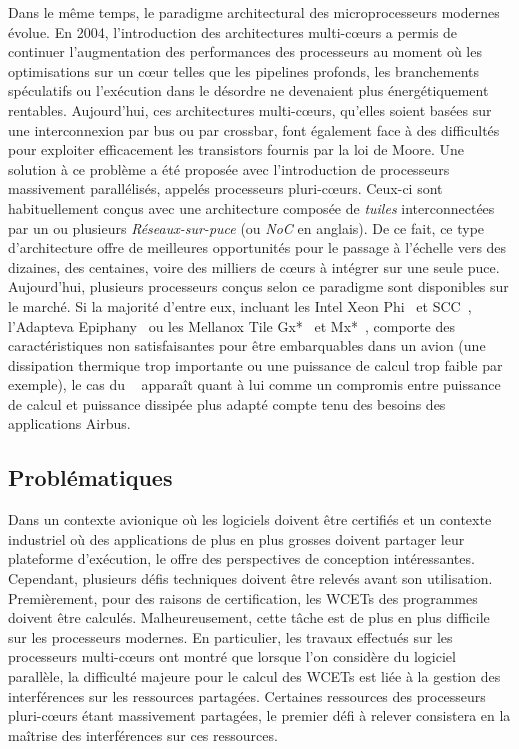 \documentclass[main.tex]{subfiles}
\begin{document}
Dans le même temps, le paradigme architectural des microprocesseurs modernes évolue. En 2004, l'introduction des architectures multi-c\oe{}urs a permis de continuer l'augmentation des performances des processeurs au moment où les optimisations sur un c\oe{}ur telles que les pipelines profonds, les branchements spéculatifs ou l'exécution dans le désordre ne devenaient plus énergétiquement rentables. Aujourd'hui, ces architectures multi-c\oe{}urs, qu'elles soient basées sur une interconnexion par bus ou par crossbar, font également face à des difficultés pour exploiter efficacement les transistors fournis par la loi de Moore. Une solution à ce problème a été proposée avec l'introduction de processeurs massivement parallélisés, appelés processeurs pluri-c\oe{}urs. Ceux-ci sont habituellement conçus avec une architecture composée de \emph{tuiles} interconnectées par un ou plusieurs \emph{Réseaux-sur-puce} (ou \emph{NoC} en anglais). De ce fait, ce type d'architecture offre de meilleures opportunités pour le passage à l'échelle vers des dizaines, des centaines, voire des milliers de c\oe{}urs à intégrer sur une seule puce. Aujourd'hui, plusieurs processeurs conçus selon ce paradigme sont disponibles sur le marché. Si la majorité d'entre eux, incluant les Intel Xeon Phi~\cite{XeonPhi} et SCC~\cite{intel_scc}, l'Adapteva Epiphany~\cite{Epiphany} ou les Mellanox Tile Gx*~\cite{TileGx} et Mx*~\cite{TileMx}, comporte des caractéristiques non satisfaisantes pour être embarquables dans un avion (une dissipation thermique trop importante ou une puissance de calcul trop faible par exemple), le cas du \mppalong~\cite{kalray_mppa} apparaît quant à lui comme un compromis entre puissance de calcul et puissance dissipée plus adapté compte tenu des besoins des applications Airbus.


\subsection{Problématiques}
Dans un contexte avionique où les logiciels doivent être certifiés et un contexte industriel où des applications de plus en plus grosses doivent partager leur plateforme d'exécution, le \mppalong offre des perspectives de conception intéressantes. Cependant, plusieurs défis techniques doivent être relevés avant son utilisation. Premièrement, pour des raisons de certification, les WCETs des programmes doivent être calculés. Malheureusement, cette tâche est de plus en plus difficile sur les processeurs modernes. En particulier, les travaux effectués sur les processeurs multi-c\oe{}urs ont montré que lorsque l'on considère du logiciel parallèle, la difficulté majeure pour le calcul des WCETs est liée à la gestion des interférences sur les ressources partagées. Certaines ressources des processeurs pluri-c\oe{}urs étant massivement partagées, le premier défi à relever consistera en la maîtrise des interférences sur ces ressources. 
\end{document}

